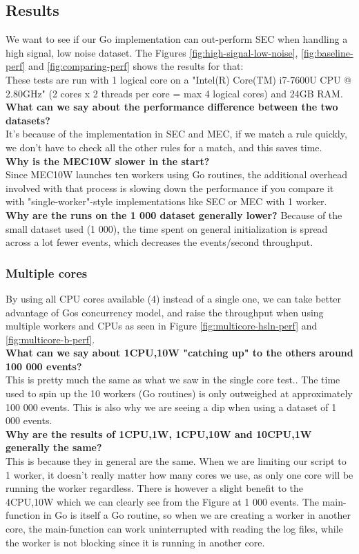 \subsection{Results}
We want to see if our Go implementation can out-perform SEC when handling a high signal, low noise dataset. The Figures \cref{fig:high-signal-low-noise}, \cref{fig:baseline-perf} and \cref{fig:comparing-perf} shows the results for that:
\\
These tests are run with 1 logical core on a "Intel(R) Core(TM) i7-7600U CPU @ 2.80GHz" (2 cores x 2 threads per core = max 4 logical cores) and 24GB RAM.\\
\textbf{What can we say about the performance difference between the two datasets?}\\
It's because of the implementation in SEC and MEC, if we match a rule quickly, we don't have to check all the other rules for a match, and this saves time.\\
\textbf{Why is the MEC10W slower in the start?}\\
Since MEC10W launches ten workers using Go routines, the additional overhead involved with that process is slowing down the performance if you compare it with "single-worker"-style implementations like SEC or MEC with 1 worker.\\
\textbf{Why are the runs on the 1 000 dataset generally lower?}
Because of the small dataset used (1 000), the time spent on general initialization is spread across a lot fewer events, which decreases the events/second throughput.

\subsubsection{Multiple cores}

By using all CPU cores available (4) instead of a single one, we can take better advantage of Gos concurrency model, and raise the throughput when using multiple workers and CPUs as seen in Figure \cref{fig:multicore-hsln-perf} and \cref{fig:multicore-b-perf}.\\
\textbf{What can we say about 1CPU,10W "catching up" to the others around 100 000 events?}\\
This is pretty much the same as what we saw in the single core test.. The time used to spin up the 10 workers (Go routines) is only outweighed at approximately 100 000 events. This is also why we are seeing a dip when using a dataset of 1 000 events.\\
\textbf{Why are the results of 1CPU,1W, 1CPU,10W and 10CPU,1W generally the same?}\\
This is because they in general are the same. When we are limiting our script to 1 worker, it doesn't really matter how many cores we use, as only one core will be running the worker regardless. There is however a slight benefit to the 4CPU,10W which we can clearly see from the Figure at 1 000 events. The main-function in Go is itself a Go routine, so when we are creating a worker in another core, the main-function can work uninterrupted with reading the log files, while the worker is not blocking since it is running in another core.

